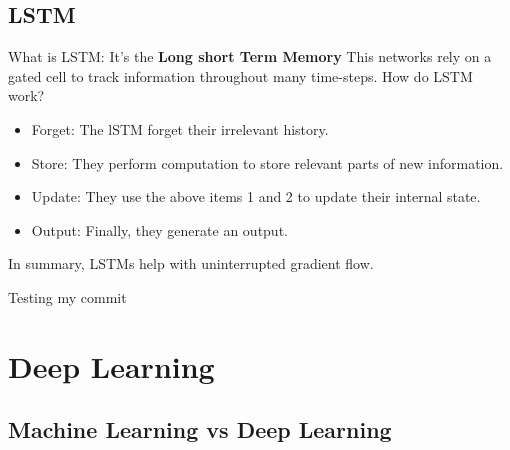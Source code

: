 \subsection{LSTM}
What is LSTM: It's the \textbf{Long short Term Memory} This networks rely on a gated cell to track information throughout many time-steps. How do LSTM work?

\begin{itemize}
	\item Forget: The lSTM forget their irrelevant history.
	
	
	\item Store: They perform computation to store relevant parts of new information.
	
	
	\item Update: They use the above items 1 and 2 to update their internal state.
	
	
	\item Output: Finally, they generate an output.
\end{itemize}

In summary, LSTMs help with uninterrupted gradient flow.

Testing my commit

\section{Deep Learning}
\subsection{Machine Learning vs Deep Learning}
